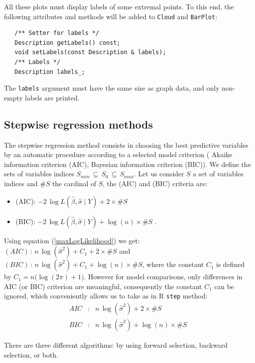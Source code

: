 All these plots must display labels of some extremal points.  To this end, the following attributes
and methods will be added to \texttt{Cloud} and \texttt{BarPlot}:
\begin{verbatim}
   /** Setter for labels */
   Description getLabels() const;
   void setLabels(const Description & labels);
   /** Labels */
   Description labels_;
\end{verbatim}
The \texttt{labels} argument must have the same size as graph data, and only non-empty labels are
printed.

\subsection{Stepwise regression methods}

The stepwise regression method consists in choosing the best predictive variables by an automatic procedure
 according to a selected model criterion ( Akaike information criterion (AIC), Bayesian information criterion (BIC)).
We define the sets of variables indices $ S_{min}\,\subseteq\, S_0\,\subseteq\, S_{max}$.
Let us consider $S$ a set of variables indices and $\# S$ the cardinal of $S$, the (AIC) and (BIC) criteria are:
\begin{itemize}
\item (AIC): $-2\,\log L(\hat{\beta},\hat{\sigma}\mid Y) + 2 \times \# S $
\item (BIC): $-2\,\log L(\hat{\beta},\hat{\sigma}\mid Y) + \log(n) \times \# S $ .
\end{itemize}

Using equation (\ref{maxLogLikelihood}) we get:
$(AIC) \,:\,  n\, \log(\hat{\sigma}^2) + C_1 + 2 \times \# S $ and $(BIC) \,:\,  n\, \log(\hat{\sigma}^2) + C_1 +\log(n) \times \# S $,
where the constant $C_1$ is defined by $ C_1 = n \big(\log(2\pi)+1\big)$. However for model comparisons, only differences in AIC (or BIC) criterion are meaningful, consequently the constant $C_1$ can be ignored,
which conveniently allows us to take as in R \texttt{step} method:
 \begin{eqnarray}
 AIC &:&  n\, \log(\hat{\sigma}^2) + 2 \times \# S  \\
 BIC &:&  n\, \log(\hat{\sigma}^2) +\log(n) \times \# S
\end{eqnarray}

There are three different algorithms: by using forward selection, backward selection, or both.

